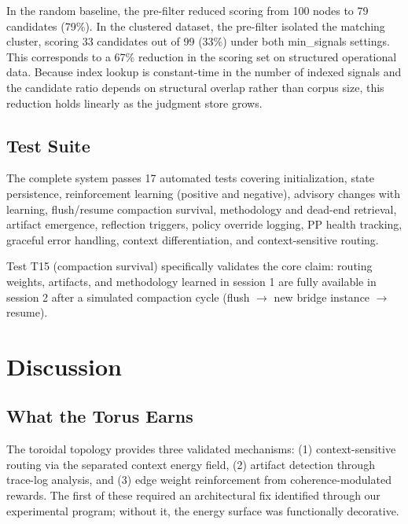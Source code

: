 \documentclass[11pt,a4paper]{article}
\begin{document}
In the random baseline, the pre-filter reduced scoring from 100 nodes to
79 candidates (79\%). In the clustered dataset, the pre-filter isolated the
matching cluster, scoring 33 candidates out of 99 (33\%) under both
min\_signals settings. This corresponds to a 67\% reduction in the scoring
set on structured operational data. Because index lookup is constant-time in
the number of indexed signals and the candidate ratio depends on structural
overlap rather than corpus size, this reduction holds linearly as the judgment
store grows.

\subsection{Test Suite}

The complete system passes 17 automated tests covering initialization,
state persistence, reinforcement learning (positive and negative),
advisory changes with learning, flush/resume compaction survival,
methodology and dead-end retrieval, artifact emergence, reflection
triggers, policy override logging, PP health tracking, graceful error
handling, context differentiation, and context-sensitive routing.

Test T15 (compaction survival) specifically validates the core claim:
routing weights, artifacts, and methodology learned in session 1 are
fully available in session 2 after a simulated compaction cycle
(flush $\rightarrow$ new bridge instance $\rightarrow$ resume).


\section{Discussion}
\label{sec:discussion}

\subsection{What the Torus Earns}

The toroidal topology provides three validated mechanisms:
(1) context-sensitive routing via the separated context energy field,
(2) artifact detection through trace-log analysis, and
(3) edge weight reinforcement from coherence-modulated rewards.
The first of these required an architectural fix identified through
our experimental program; without it, the energy surface was
functionally decorative.
\end{document}
